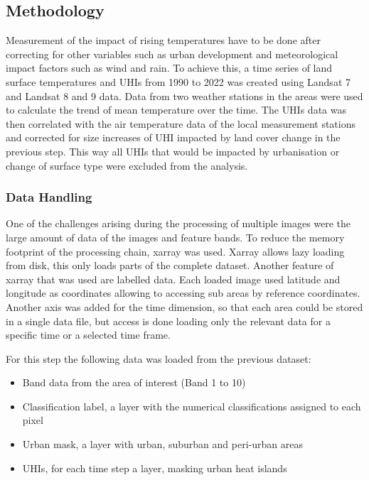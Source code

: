 \documentclass[12pt,a4paper, english,twoside]{scrartcl}
\begin{document}
    \subsection{Methodology}
      Measurement of the impact of rising temperatures have to be done after correcting for other variables such as urban development and meteorological impact factors such as wind and rain. 
      To achieve this, a time series of land surface temperatures and \glspl{UHI} from 1990 to 2022 was created using Landsat 7 and Landsat 8 and 9 data.
      Data from two weather stations in the areas were used to calculate the trend of mean temperature over the time. 
      The \glspl{UHI} data was then correlated with the air temperature data of the local measurement stations and corrected for size increases of \gls{UHI} impacted by land cover change in the previous step. 
      This way all \glspl{UHI} that would be impacted by urbanisation or change of surface type were excluded from the analysis.
    \subsubsection{Data Handling}
      One of the challenges arising during the processing of multiple images were the large amount of data of the images and feature bands. 
      To reduce the memory footprint of the processing chain, xarray \autocite{hoyer2017xarray} was used. 
      Xarray allows lazy loading from disk, this only loads parts of the complete dataset. 
      Another feature of xarray that was used are labelled data. Each loaded image used latitude and longitude as coordinates allowing to accessing sub areas by reference coordinates. 
      Another axis was added for the time dimension, so that each area could be stored in a single data file, but access is done loading only the relevant data for a specific time or a selected time frame.
  
      For this step the following data was loaded from the previous dataset: 
      \begin{itemize}
        \item Band data from the area of interest (Band 1 to 10)
        \item Classification label, a layer with the numerical classifications assigned to each pixel 
        \item Urban mask, a layer with urban, suburban and peri-urban areas
        \item \glspl{UHI}, for each time step a layer, masking urban heat islands
      \end{itemize}
\end{document}
